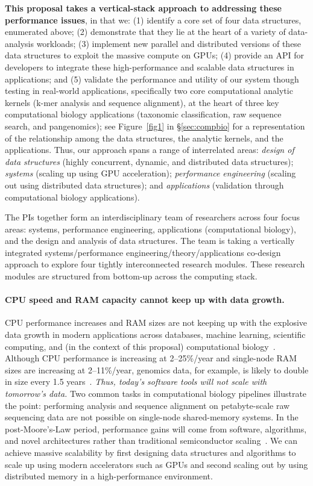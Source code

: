 \textbf{This proposal takes  a vertical-stack approach to addressing these performance issues}, in that we: 
(1) identify a core set of four data structures, enumerated above;
(2) demonstrate that they lie at the heart of a variety of data-analysis workloads; (3) implement  
new parallel and distributed versions of these data structures to exploit the
massive compute on GPUs; (4) provide an API for developers to integrate these high-performance
and scalable data structures in applications; and (5) validate the performance and utility of our system though testing in real-world applications, specifically two core computational analytic kernels (k-mer analysis and sequence alignment), at the heart of three key computational biology applications (taxonomic classification, raw sequence search, and pangenomics); see Figure~\ref{fig1} in \S\ref{sec:compbio} for a representation of the relationship among the data structures, the analytic kernels, and the applications.  Thus, our approach spans a range of interrelated areas: 
\emph{design of data structures} (highly concurrent, dynamic, and distributed
data structures); \emph{systems} (scaling up using GPU acceleration);
\emph{performance engineering} (scaling out using distributed data
structures); and \emph{applications} (validation through computational biology applications). 

%
The PIs together form an interdisciplinary team of researchers across four
focus areas: systems, performance engineering, applications (computational biology), and the design and analysis of data structures. The team is taking a vertically integrated
systems/performance engineering/theory/applications co-design approach to explore four tightly
interconnected research modules. These research modules are structured from
bottom-up across the computing stack.


\paragraph{CPU speed and RAM capacity cannot keep up with data growth.} CPU
performance increases and RAM sizes are not keeping up with the explosive data growth in
modern applications across databases, machine learning, scientific computing, and (in the context of this proposal) computational biology~\cite{Chen:2021:TGS}. Although CPU performance is increasing at
2--25\%/year and single-node RAM sizes are increasing at 2--11\%/year, genomics
data, for example, is likely to double in size every 1.5 years~\cite{kodama2012sequence}. 
\emph{Thus, today's software tools will not scale with tomorrow's data.} 
Two common tasks in
computational biology pipelines illustrate the point: 
performing \kmer analysis and sequence alignment  on petabyte-scale raw sequencing data are not
possible on single-node shared-memory systems. 
In the post-Moore's-Law period,
performance gains will come from software, algorithms, and novel architectures rather than
traditional semiconductor scaling~\cite{leiserson2020there}. We can achieve massive scalability by
first designing data structures and algorithms to scale up using modern
accelerators such as GPUs and second scaling out by using distributed memory
in a high-performance environment.


